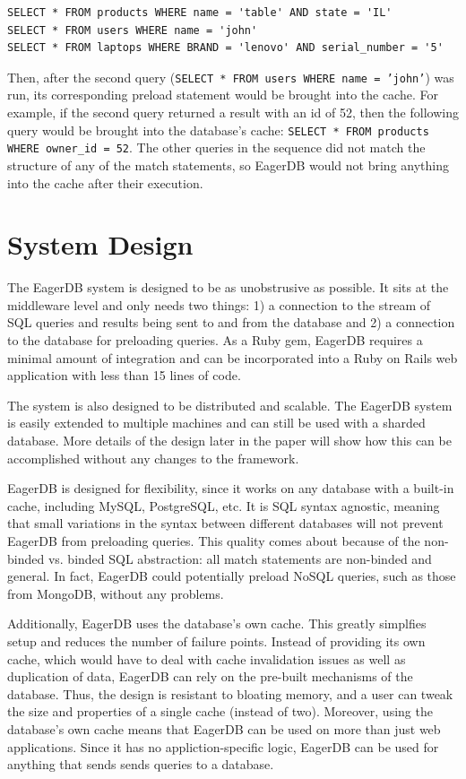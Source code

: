\documentclass[12pt]{article}
\begin{document}
\begin{lstlisting}
SELECT * FROM products WHERE name = 'table' AND state = 'IL'
SELECT * FROM users WHERE name = 'john'
SELECT * FROM laptops WHERE BRAND = 'lenovo' AND serial_number = '5'
\end{lstlisting}

Then, after the second query (\texttt{SELECT * FROM users WHERE name = 'john'}) was run, its corresponding preload statement would be brought into the cache. For example, if the second query returned a result with an id of 52, then the following query would be brought into the database's cache: \texttt{SELECT * FROM products WHERE owner\_id = 52}. The other queries in the sequence did not match the structure of any of the match statements, so EagerDB would not bring anything into the cache after their execution.

\section{System Design}

The EagerDB system is designed to be as unobstrusive as possible. It sits at the middleware level and only needs two things: 1) a connection to the stream of SQL queries and results being sent to and from the database and 2) a connection to the database for preloading queries. As a Ruby gem, EagerDB requires a minimal amount of integration and can be incorporated into a Ruby on Rails web application with less than 15 lines of code.

The system is also designed to be distributed and scalable. The EagerDB system is easily extended to multiple machines and can still be used with a sharded database. More details of the design later in the paper will show how this can be accomplished without any changes to the framework.

EagerDB is designed for flexibility, since it works on any database with a built-in cache, including MySQL, PostgreSQL, etc. It is SQL syntax agnostic, meaning that small variations in the syntax between different databases will not prevent EagerDB from preloading queries. This quality comes about because of the non-binded vs. binded SQL abstraction: all match statements are non-binded and general. In fact, EagerDB could potentially preload NoSQL queries, such as those from MongoDB, without any problems.

Additionally, EagerDB uses the database's own cache. This greatly simplfies setup and reduces the number of failure points. Instead of providing its own cache, which would have to deal with cache invalidation issues as well as duplication of data, EagerDB can rely on the pre-built mechanisms of the database. Thus, the design is resistant to bloating memory, and a user can tweak the size and properties of a single cache (instead of two). Moreover, using the database's own cache means that EagerDB can be used on more than just web applications. Since it has no appliction-specific logic, EagerDB can be used for anything that sends sends queries to a database.
\end{document}
